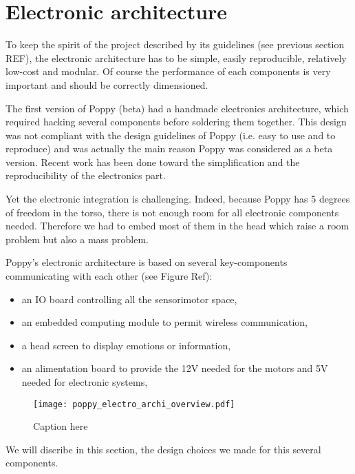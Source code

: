 
\section{Electronic architecture} %

To keep the spirit of the project described by its guidelines (see previous section REF), the electronic architecture has to be simple, easily reproducible, relatively low-cost and modular. Of course the performance of each components is very important and should be correctly dimensioned.

The first version of Poppy (beta) had a handmade electronics architecture, which required hacking several components before soldering them together. This design was not compliant with the design guidelines of Poppy (i.e. easy to use and to reproduce) and was actually the main reason Poppy was considered as a beta version. Recent work has been done toward the simplification and the reproducibility of the electronics part.

Yet the electronic integration is challenging. Indeed, because Poppy has 5 degrees of freedom in the torso, there is not enough room for all electronic components needed. Therefore we had to embed most of them in the head which raise a room problem but also a mass problem.


Poppy's electronic architecture is based on several key-components communicating with each other (see Figure Ref):
\begin{itemize}
    \item an IO board controlling all the sensorimotor space,
    \item an embedded computing module to permit wireless communication,
    \item a head screen to display emotions or information,
    \item an alimentation board to provide the 12V needed for the motors and 5V needed for electronic systems,
\end{itemize}

\begin{figure}[tb]
    \begin{center}
        \texttt{[image: poppy\_electro\_archi\_overview.pdf]}
    \end{center}
    \caption{Caption here}
    \label{fig:figure1}
\end{figure}

We will discribe in this section, the design choices we made for this several components.

